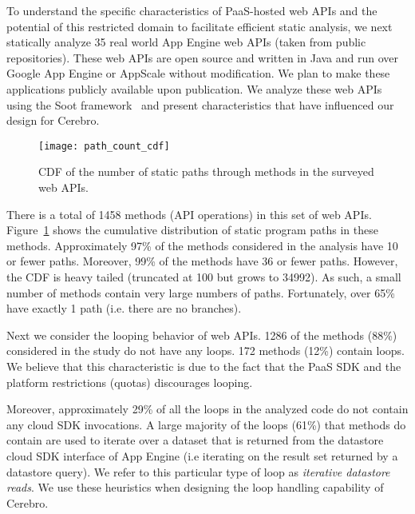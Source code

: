 To understand the specific characteristics of PaaS-hosted web APIs and the potential
of this restricted domain to facilitate efficient static analysis, 
we next statically analyze 35 real world App Engine web APIs (taken from public 
repositories). These web APIs are open 
source and written in Java and run over Google App Engine or AppScale without modification.
We plan to make these applications publicly available upon publication.
We analyze these web APIs 
using the Soot framework~\cite{Vallee-Rai:2010:SJB:1925805.1925818} 
and present characteristics that have influenced our design for Cerebro.

\begin{figure}
\centering
\texttt{[image: path\_count\_cdf]}
\caption{CDF of the number of static paths through methods in the surveyed web APIs.}
\label{fig:path_count_cdf}
\end{figure}

There is a total of 1458 methods (API operations) in this set of web APIs.
Figure~\ref{fig:path_count_cdf} shows the cumulative distribution of 
static program paths in these methods.
Approximately 97\% of the methods considered in the analysis have 10 or fewer paths. 
Moreover,  99\% of 
the methods have 36 or fewer paths. However, the CDF is heavy tailed
(truncated at 100 but grows to 34992). As such, a small number of methods 
contain very large numbers of paths.
Fortunately, over
65\% have exactly 1 path (i.e. there are no branches).

Next we consider the looping behavior of web APIs. 
1286 of the methods (88\%)
considered in the study
do not have any loops. 172 methods (12\%) contain loops. 
We believe that this characteristic is due to the fact that 
the PaaS SDK and the platform restrictions (quotas) discourages 
looping.

Moreover, approximately 29\% of all the loops in 
the analyzed code do not contain any cloud SDK invocations. 
A large majority of the loops (61\%) that methods do contain are
used to iterate over a dataset that is returned from the datastore cloud SDK interface 
of App Engine (i.e iterating on the result set 
returned by a datastore query). We refer to this particular type of 
loop as \textit{iterative datastore reads}. 
We use these heuristics when designing the loop handling capability of Cerebro.

